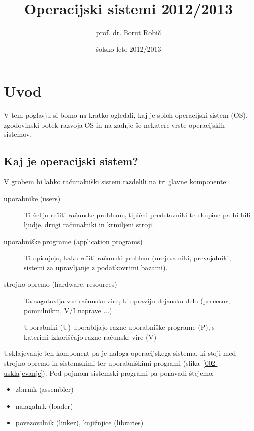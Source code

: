 \documentclass[
  slovene,
  a4paper
]{book}
\begin{document}
\title{Operacijski sistemi 2012/2013}
\author{prof. dr. Borut Robič }
\date{šolsko leto 2012/2013}

\maketitle

\chapter{Uvod}

V tem poglavju si bomo na kratko ogledali, kaj je sploh operacijski sistem (OS), zgodovinski potek razvoja OS in na zadnje še nekatere vrste operacijskih sistemov.


\section{Kaj je operacijski sistem?}

V grobem bi lahko računalniški sistem razdelili na tri glavne komponente:

\begin{description}
  \item[uporabnike (users)] Ti želijo rešiti računske probleme, tipični predstavniki te skupine pa bi bili ljudje, drugi računalniki in krmiljeni stroji.
  \item[uporabniške programe (application programs)] Ti opisujejo, kako rešiti računski problem (urejevalniki, prevajalniki, sistemi za upravljanje z podatkovnimi bazami).
  \item[strojno opremo (hardware, resources)] Ta zagotavlja vse računske vire, ki opravijo dejansko delo (procesor, pomnilnikm, V/I naprave ...).
\end{description}

\begin{figure}[h!]
  \centering
  
  \caption{Uporabniki (U) uporabljajo razne uporabniške programe (P), s katerimi izkoriščajo razne računske vire (V)}
  \label{001-racunalsniski-sistem}
\end{figure}

Usklajevanje teh komponent pa je naloga operacijskega sistema, ki stoji med strojno opremo in sistemskimi ter uporabniškimi programi (slika~\ref{002-usklajevanje}). Pod pojmom sistemski programi pa ponavadi štejemo:
\begin{itemize}
  \item zbirnik (assembler)
  \item nalagalnik (loader)
  \item povezovalnik (linker), knjižnjice (libraries)
\end{itemize}
\end{document}
